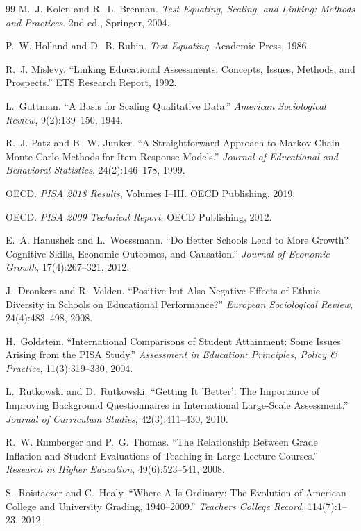 \documentclass[12pt,a4paper]{article}
\theoremstyle{remark}
\begin{document}
\begin{thebibliography}{99}
M.~J. Kolen and R.~L. Brennan. \emph{Test Equating, Scaling, and Linking: Methods and Practices}. 2nd ed., Springer, 2004.

P.~W. Holland and D.~B. Rubin. \emph{Test Equating}. Academic Press, 1986.

R.~J. Mislevy. ``Linking Educational Assessments: Concepts, Issues, Methods, and Prospects.'' ETS Research Report, 1992.

L.~Guttman. ``A Basis for Scaling Qualitative Data.'' \emph{American Sociological Review}, 9(2):139--150, 1944.

R.~J. Patz and B.~W. Junker. ``A Straightforward Approach to Markov Chain Monte Carlo Methods for Item Response Models.'' \emph{Journal of Educational and Behavioral Statistics}, 24(2):146--178, 1999.

OECD. \emph{PISA 2018 Results}, Volumes I--III. OECD Publishing, 2019.

OECD. \emph{PISA 2009 Technical Report}. OECD Publishing, 2012.

E.~A. Hanushek and L.~Woessmann. ``Do Better Schools Lead to More Growth? Cognitive Skills, Economic Outcomes, and Causation.'' \emph{Journal of Economic Growth}, 17(4):267--321, 2012.

J.~Dronkers and R.~Velden. ``Positive but Also Negative Effects of Ethnic Diversity in Schools on Educational Performance?'' \emph{European Sociological Review}, 24(4):483--498, 2008.

H.~Goldstein. ``International Comparisons of Student Attainment: Some Issues Arising from the PISA Study.'' \emph{Assessment in Education: Principles, Policy \& Practice}, 11(3):319--330, 2004.

L.~Rutkowski and D.~Rutkowski. ``Getting It 'Better': The Importance of Improving Background Questionnaires in International Large-Scale Assessment.'' \emph{Journal of Curriculum Studies}, 42(3):411--430, 2010.

R.~W. Rumberger and P.~G. Thomas. ``The Relationship Between Grade Inflation and Student Evaluations of Teaching in Large Lecture Courses.'' \emph{Research in Higher Education}, 49(6):523--541, 2008.

S.~Roistaczer and C.~Healy. ``Where A Is Ordinary: The Evolution of American College and University Grading, 1940--2009.'' \emph{Teachers College Record}, 114(7):1--23, 2012.


\end{thebibliography}
\end{document}
